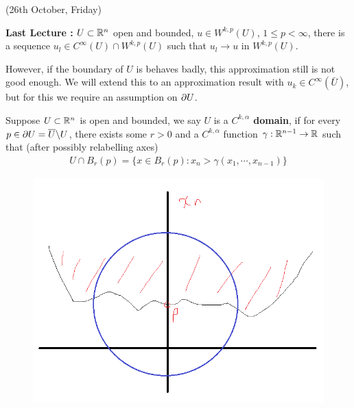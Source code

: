 \documentclass[12pt,a4paper]{report}
\begin{document}
\newday

(26th October, Friday)
\s

\textbf{Last Lecture :} $U\subset \mathbb{R}^n$ open and bounded, $u\in W^{k,p} (U) $, $1\leq  p<\infty$, there is a sequence $u_l \in C^{\infty}(U) \cap W^{k,p}(U)$ such that $u_l \rightarrow u$ in $W^{k,p}(U)$.
\s

However, if the boundary of $U$ is behaves badly, this approximation still is not good enough. We will extend this to an approximation result with $u_k \in C^{\infty}(\bar{U})$, but for this we require an assumption on $\partial U$.
\s

 Suppose $U\subset \mathbb{R}^n$ is open and bounded, we say $U$ is a \textbf{$C^{k,\alpha}$ domain}, if for every $p\in \partial U = \overline{U} \backslash U$, there exists some $r>0$ and a $C^{k,\alpha}$ function $\gamma : \mathbb{R}^{n-1} \rightarrow \mathbb{R}$ such that (after possibly relabelling axes)
\begin{align*}
U \cap B_r (p) = \{ x\in B_{r}(p) : x_n > \gamma(x_1, \cdots, x_{n-1}) \}
\end{align*}
\begin{figure}[h]
	\centering
	\includegraphics[scale=0.5]{2}
\end{figure}
\end{document}

